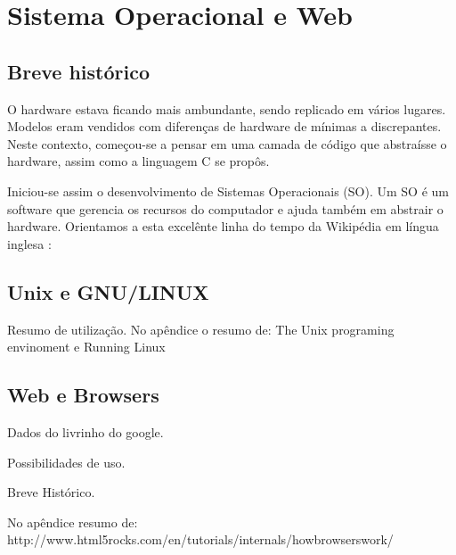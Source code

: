 \section{Sistema Operacional e Web}

\subsection{Breve histórico}

O hardware estava ficando mais ambundante, sendo replicado em 
vários lugares. Modelos eram vendidos com diferenças de hardware 
de mínimas a discrepantes. Neste contexto, começou-se a
pensar em uma camada de código que abstraísse o hardware, assim
como a linguagem C se propôs.

Iniciou-se assim o desenvolvimento de Sistemas Operacionais (SO).
Um SO é um software que gerencia os recursos do computador e ajuda
também em abstrair o hardware. Orientamos a esta excelênte linha do
tempo da Wikipédia em língua inglesa \cite{solinhadotempo}:



\subsection{Unix e GNU/LINUX}

Resumo de utilização. No apêndice o resumo de:
The Unix programing envinoment
e
Running Linux

\subsection{Web e Browsers}

Dados do livrinho do google.

Possibilidades de uso.

Breve Histórico.

No apêndice resumo de:
http://www.html5rocks.com/en/tutorials/internals/howbrowserswork/



